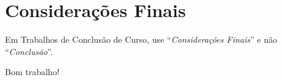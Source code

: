 \chapter{Considerações Finais}\label{conclusao}

Em Trabalhos de Conclusão de Curso, use ``\emph{Considerações Finais}'' e não ``\emph{Conclusão}''.

Bom trabalho!
